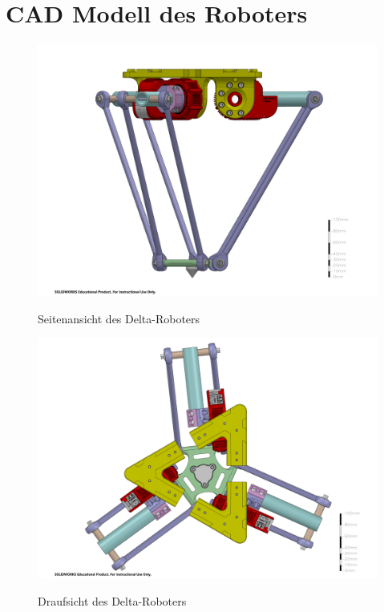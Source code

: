 \documentclass[Bachelor, BMR, ngerman]{twbook}
\begin{document}
\clearpage  
\chapter{CAD Modell des Roboters}
\label{app:cad}
    
    
    \begin{figure}[ht]
      \centering
      {
        \includegraphics[width=\linewidth]{delta-unattached-side-view.PDF}
      }
      \caption[Seitenansicht des Delta-Roboters]{Seitenansicht des Delta-Roboters}
      \label{fig:delta-side-view}
    \end{figure}
    
    \begin{figure}[ht]
      \centering
      {
          \includegraphics[width=\linewidth]{delta-unattached-top-view.PDF}
      }
      \caption[Draufsicht des Delta-Roboters]{Draufsicht des Delta-Roboters}
      \label{fig:delta-top-view}
    \end{figure}
    
    
\end{document}

